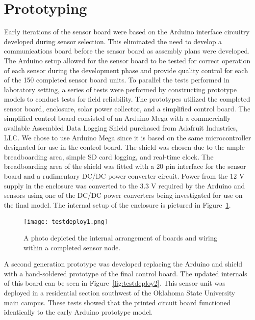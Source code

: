 \documentclass[numbook, envcountsect, envcountsame, envcountreset, runningheads, twocolumn]{svjour3}
\begin{document}
	\section{Prototyping}
	
		Early iterations of the sensor board were based on the Arduino interface circuitry developed during sensor selection.  This eliminated the need to develop a communications board before the sensor board as assembly plans were developed.  The Arduino setup allowed for the sensor board to be tested for correct operation of each sensor during the development phase and provide quality control for each of the 150 completed sensor board units.  To parallel the tests performed in laboratory setting, a series of tests were performed by constructing prototype models to conduct tests for field reliability.  The prototypes utilized the completed sensor board, enclosure, solar power collector, and a simplified control board.  The simplified control board consisted of an Arduino Mega with a commercially available Assembled Data Logging Shield purchased from Adafruit Industries, LLC.  We chose to use Arduino Mega since it is based on the same microcontroller designated for use in the control board.  The shield was chosen due to the ample breadboarding area, simple SD card logging, and real-time clock.  The breadboarding area of the shield was fitted with a 20 pin interface for the sensor board and a rudimentary DC/DC power converter circuit.  Power from the 12 V supply in the enclosure was converted to the 3.3 V required by the Arduino and sensors using one of the DC/DC power converters being investigated for use on the final model.  The internal setup of the enclosure is pictured in Figure~\ref{fig:TLFig3_e}.  
		
		\begin{figure}[!t]
			\centering
			\texttt{[image: testdeploy1.png]}
			\caption[Completed Sensor Node]{A photo depicted the internal arrangement of boards and wiring within a completed sensor node.\label{fig:TLFig3_e}}
		\end{figure}
		
		A second generation prototype was developed replacing the Arduino and shield with a hand-soldered prototype of the final control board.  The updated internals of this board can be seen in Figure~\ref{fig:testdeploy2}.  This sensor unit was deployed in a residential section southwest of the Oklahoma State University main campus.  These tests showed that the printed circuit board functioned identically to the early Arduino prototype model.
		
\end{document}
